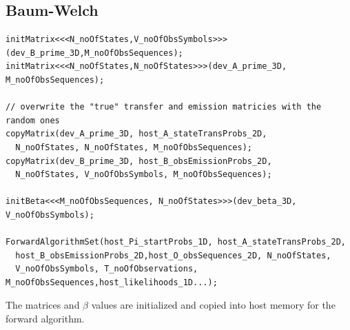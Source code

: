 \documentclass[english, paper=a4]{scrartcl}
\begin{document}
\subsection{Baum-Welch}

\begin{verbatim}
initMatrix<<<N_noOfStates,V_noOfObsSymbols>>>(dev_B_prime_3D,M_noOfObsSequences);
initMatrix<<<N_noOfStates,N_noOfStates>>>(dev_A_prime_3D, M_noOfObsSequences);
	
// overwrite the "true" transfer and emission matricies with the random ones
copyMatrix(dev_A_prime_3D, host_A_stateTransProbs_2D,
  N_noOfStates, N_noOfStates, M_noOfObsSequences);
copyMatrix(dev_B_prime_3D, host_B_obsEmissionProbs_2D, 
  N_noOfStates, V_noOfObsSymbols, M_noOfObsSequences);
	
initBeta<<<M_noOfObsSequences, N_noOfStates>>>(dev_beta_3D, V_noOfObsSymbols);
	
ForwardAlgorithmSet(host_Pi_startProbs_1D, host_A_stateTransProbs_2D, 
  host_B_obsEmissionProbs_2D,host_O_obsSequences_2D, N_noOfStates, 
  V_noOfObsSymbols, T_noOfObservations, M_noOfObsSequences,host_likelihoods_1D...);
\end{verbatim}

The matrices and $\beta$ values are initialized and copied into host memory for the forward algorithm.
	
\end{document}
